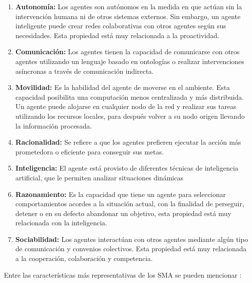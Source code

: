 \begin{enumerate}
\item \textbf{Autonomía:} Los agentes son autónomos en la medida en que actúan sin la
intervención humana ni de otros sistemas externos. Sin embargo, un agente
inteligente puede crear redes colaborativas con otros agentes según sus
necesidades. Esta propiedad está muy relacionada a la proactividad.
\item \textbf{Comunicación:} Los agentes tienen la capacidad de comunicarse con otros agentes
utilizando un lenguaje basado en ontologías o realizar intervenciones asíncronas
a través de comunicación indirecta.
\item \textbf{Movilidad:} Es la habilidad del agente de
moverse en el ambiente. Esta capacidad posibilita una computación menos
centralizada y más distribuida. Un agente puede alojarse en cualquier nodo de la
red y realizar sus tareas utilizando los recursos locales, para después volver a
su nodo origen llevando la información procesada.
\item \textbf{Racionalidad:} Se refiere a
que los agentes prefieren ejecutar la acción más prometedora o eficiente para
conseguir sus metas.
\item \textbf{Inteligencia:} El agente está provisto de diferentes
técnicas de inteligencia artificial, que le permiten analizar situaciones
dinámicas
\item \textbf{Razonamiento:} Es la capacidad que tiene un agente para seleccionar
comportamientos acordes a la situación actual, con la finalidad de perseguir,
detener o en su defecto abandonar un objetivo, esta propiedad está muy
relacionada con la inteligencia.
\item \textbf{Sociabilidad:} Los agentes interactúan con
otros agentes mediante algún tipo de comunicación y convenios colectivos. Esta
propiedad está muy relacionada a la cooperación, colaboración y competencia.
\end{enumerate}

Entre las características más representativas de los SMA se pueden mencionar
\citep{schweitzer2007}:

